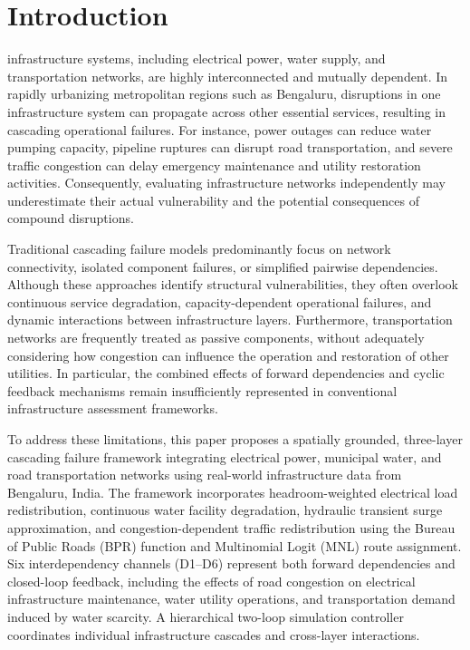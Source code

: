 \documentclass[oneside]{ieeeaccess}
\begin{document}
\titlepgskip=-21pt

\maketitle

\section{Introduction}
\label{sec:introduction}

 infrastructure systems, including electrical power, water supply, and transportation networks, are highly interconnected and mutually dependent. In rapidly urbanizing metropolitan regions such as Bengaluru, disruptions in one infrastructure system can propagate across other essential services, resulting in cascading operational failures. For instance, power outages can reduce water pumping capacity, pipeline ruptures can disrupt road transportation, and severe traffic congestion can delay emergency maintenance and utility restoration activities. Consequently, evaluating infrastructure networks independently may underestimate their actual vulnerability and the potential consequences of compound disruptions.

Traditional cascading failure models predominantly focus on network connectivity, isolated component failures, or simplified pairwise dependencies. Although these approaches identify structural vulnerabilities, they often overlook continuous service degradation, capacity-dependent operational failures, and dynamic interactions between infrastructure layers. Furthermore, transportation networks are frequently treated as passive components, without adequately considering how congestion can influence the operation and restoration of other utilities. In particular, the combined effects of forward dependencies and cyclic feedback mechanisms remain insufficiently represented in conventional infrastructure assessment frameworks.

To address these limitations, this paper proposes a spatially grounded, three-layer cascading failure framework integrating electrical power, municipal water, and road transportation networks using real-world infrastructure data from Bengaluru, India. The framework incorporates headroom-weighted electrical load redistribution, continuous water facility degradation, hydraulic transient surge approximation, and congestion-dependent traffic redistribution using the Bureau of Public Roads (BPR) function and Multinomial Logit (MNL) route assignment. Six interdependency channels (D1--D6) represent both forward dependencies and closed-loop feedback, including the effects of road congestion on electrical infrastructure maintenance, water utility operations, and transportation demand induced by water scarcity. A hierarchical two-loop simulation controller coordinates individual infrastructure cascades and cross-layer interactions.
\end{document}
